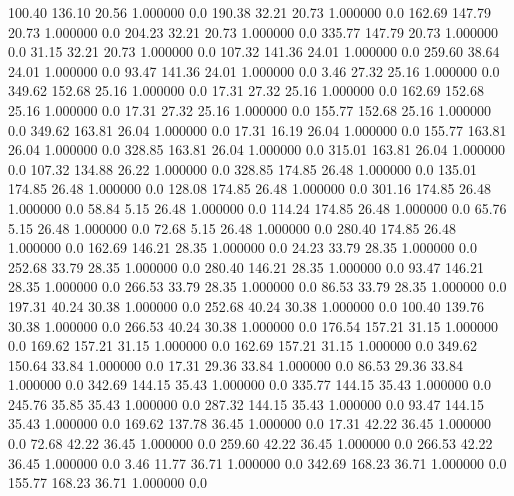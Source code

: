   100.40  136.10   20.56    1.000000    0.0
  190.38   32.21   20.73    1.000000    0.0
  162.69  147.79   20.73    1.000000    0.0
  204.23   32.21   20.73    1.000000    0.0
  335.77  147.79   20.73    1.000000    0.0
   31.15   32.21   20.73    1.000000    0.0
  107.32  141.36   24.01    1.000000    0.0
  259.60   38.64   24.01    1.000000    0.0
   93.47  141.36   24.01    1.000000    0.0
    3.46   27.32   25.16    1.000000    0.0
  349.62  152.68   25.16    1.000000    0.0
   17.31   27.32   25.16    1.000000    0.0
  162.69  152.68   25.16    1.000000    0.0
   17.31   27.32   25.16    1.000000    0.0
  155.77  152.68   25.16    1.000000    0.0
  349.62  163.81   26.04    1.000000    0.0
   17.31   16.19   26.04    1.000000    0.0
  155.77  163.81   26.04    1.000000    0.0
  328.85  163.81   26.04    1.000000    0.0
  315.01  163.81   26.04    1.000000    0.0
  107.32  134.88   26.22    1.000000    0.0
  328.85  174.85   26.48    1.000000    0.0
  135.01  174.85   26.48    1.000000    0.0
  128.08  174.85   26.48    1.000000    0.0
  301.16  174.85   26.48    1.000000    0.0
   58.84    5.15   26.48    1.000000    0.0
  114.24  174.85   26.48    1.000000    0.0
   65.76    5.15   26.48    1.000000    0.0
   72.68    5.15   26.48    1.000000    0.0
  280.40  174.85   26.48    1.000000    0.0
  162.69  146.21   28.35    1.000000    0.0
   24.23   33.79   28.35    1.000000    0.0
  252.68   33.79   28.35    1.000000    0.0
  280.40  146.21   28.35    1.000000    0.0
   93.47  146.21   28.35    1.000000    0.0
  266.53   33.79   28.35    1.000000    0.0
   86.53   33.79   28.35    1.000000    0.0
  197.31   40.24   30.38    1.000000    0.0
  252.68   40.24   30.38    1.000000    0.0
  100.40  139.76   30.38    1.000000    0.0
  266.53   40.24   30.38    1.000000    0.0
  176.54  157.21   31.15    1.000000    0.0
  169.62  157.21   31.15    1.000000    0.0
  162.69  157.21   31.15    1.000000    0.0
  349.62  150.64   33.84    1.000000    0.0
   17.31   29.36   33.84    1.000000    0.0
   86.53   29.36   33.84    1.000000    0.0
  342.69  144.15   35.43    1.000000    0.0
  335.77  144.15   35.43    1.000000    0.0
  245.76   35.85   35.43    1.000000    0.0
  287.32  144.15   35.43    1.000000    0.0
   93.47  144.15   35.43    1.000000    0.0
  169.62  137.78   36.45    1.000000    0.0
   17.31   42.22   36.45    1.000000    0.0
   72.68   42.22   36.45    1.000000    0.0
  259.60   42.22   36.45    1.000000    0.0
  266.53   42.22   36.45    1.000000    0.0
    3.46   11.77   36.71    1.000000    0.0
  342.69  168.23   36.71    1.000000    0.0
  155.77  168.23   36.71    1.000000    0.0
